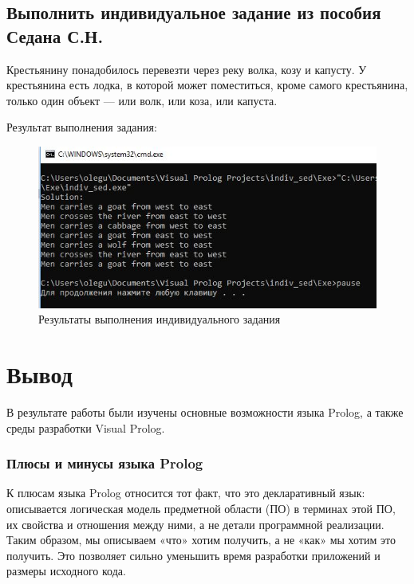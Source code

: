 \documentclass[14pt,a4paper,report]{report}
\begin{document}
\clearpage
\subsection{Выполнить индивидуальное задание из пособия Седана С.Н.}

Крестьянину понадобилось перевезти через реку волка, козу и капусту. У крестьянина есть лодка, в которой может поместиться, кроме самого крестьянина, только один объект — или волк, или коза, или капуста. 




Результат выполнения задания:

\begin{figure}[h!]
	\centering
	\includegraphics[scale = 0.9]{images/i2.png}
	\caption{Результаты выполнения индивидуального задания}
\end{figure}











\section{Вывод}

В результате работы были изучены основные возможности языка Prolog, а также среды разработки Visual Prolog.

\subsubsection{Плюсы и минусы языка Prolog}

К плюсам языка Prolog относится тот факт, что это декларативный язык: описывается логическая модель предметной области (ПО) в терминах этой ПО, их свойства и отношения между ними, а не детали программной реализации. Таким образом, мы описываем «что» хотим получить, а не «как» мы хотим это получить. Это позволяет сильно уменьшить время разработки приложений и размеры исходного кода.
\end{document}
